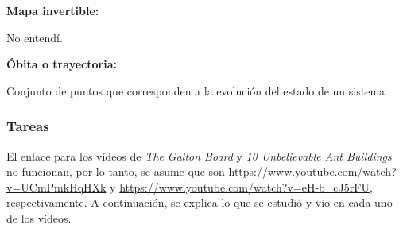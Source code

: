 \documentclass[12pt]{article}
\newcounter{subsubsubsection}[subsubsection]
\begin{document}
\begin{tcolorbox}
  \textbf{\LARGE Mapa invertible:}

  No entendí.
\end{tcolorbox}

\begin{tcolorbox}
  \textbf{\LARGE Óbita o trayectoria:}

  Conjunto de puntos que corresponden a la evolución del estado de un sistema
\end{tcolorbox}



\subsubsection{Tareas}


El enlace para los vídeos de \textit{The Galton Board} y \textit{10 Unbelievable Ant Buildings} no funcionan, por lo tanto, se asume que son \url{https://www.youtube.com/watch?v=UCmPmkHqHXk} y \url{https://www.youtube.com/watch?v=eH-b_cJ5rFU}, respectivamente. A continuación, se explica lo que se estudió y vio en cada uno de los vídeos.
\end{document}
